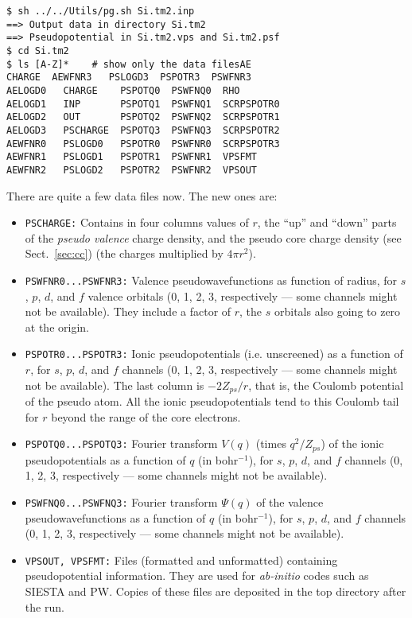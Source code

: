 \documentclass[11pt]{article}
\begin{document}
\begin{verbatim}
$ sh ../../Utils/pg.sh Si.tm2.inp
==> Output data in directory Si.tm2
==> Pseudopotential in Si.tm2.vps and Si.tm2.psf
$ cd Si.tm2
$ ls [A-Z]*    # show only the data filesAE
CHARGE  AEWFNR3   PSLOGD3  PSPOTR3  PSWFNR3     
AELOGD0   CHARGE    PSPOTQ0  PSWFNQ0  RHO         
AELOGD1   INP       PSPOTQ1  PSWFNQ1  SCRPSPOTR0  
AELOGD2   OUT       PSPOTQ2  PSWFNQ2  SCRPSPOTR1  
AELOGD3   PSCHARGE  PSPOTQ3  PSWFNQ3  SCRPSPOTR2  
AEWFNR0   PSLOGD0   PSPOTR0  PSWFNR0  SCRPSPOTR3  
AEWFNR1   PSLOGD1   PSPOTR1  PSWFNR1  VPSFMT      
AEWFNR2   PSLOGD2   PSPOTR2  PSWFNR2  VPSOUT      
\end{verbatim}

There are quite a few data files now. The new ones are:
\begin{itemize}

\item  {\tt PSCHARGE:} Contains in four
columns values of $r$, the ``up'' and ``down'' parts of the {\sl
pseudo valence} charge density, and the pseudo core charge density
(see Sect.~\ref{sec:cc}) (the charges
multiplied by $4\pi r^2$).

\item {\tt PSWFNR0...PSWFNR3:} Valence pseudowavefunctions as function
of radius, for $s$, $p$, $d$, and $f$ valence orbitals (0, 1, 2, 3,
respectively --- some channels might not be available). They include 
a factor of $r$, the $s$ orbitals also going to zero at the origin.

\item {\tt PSPOTR0...PSPOTR3:} Ionic pseudopotentials (i.e. unscreened)
as a function of $r$, for $s$, $p$, $d$, and $f$ channels (0, 1, 2, 3,
respectively --- some channels might not be available). The last
column is $-2Z_{ps}/r$, that is, the Coulomb potential of the pseudo
atom. All the ionic pseudopotentials tend to this Coulomb tail for $r$
beyond the range of the core electrons.

\item {\tt PSPOTQ0...PSPOTQ3:} Fourier transform $V(q)$ (times
$q^2/Z_{ps}$) of the ionic pseudopotentials as a function of $q$ (in
bohr$^{-1}$), for $s$, $p$, $d$, and $f$ channels (0, 1, 2, 3,
respectively --- some channels might not be available).

\item {\tt PSWFNQ0...PSWFNQ3:} Fourier transform $\Psi(q)$ of the 
valence pseudowavefunctions as a function of $q$ (in
bohr$^{-1}$), for $s$, $p$, $d$, and $f$ channels (0, 1, 2, 3,
respectively --- some channels might not be available).

\item {\tt VPSOUT, VPSFMT:} Files (formatted and unformatted)
containing pseudopotential information. They are used for {\it
ab-initio} codes such as {\sc SIESTA} and {\sc PW}. Copies of these
files are deposited in the top directory after the run.

\end{itemize}
\end{document}
